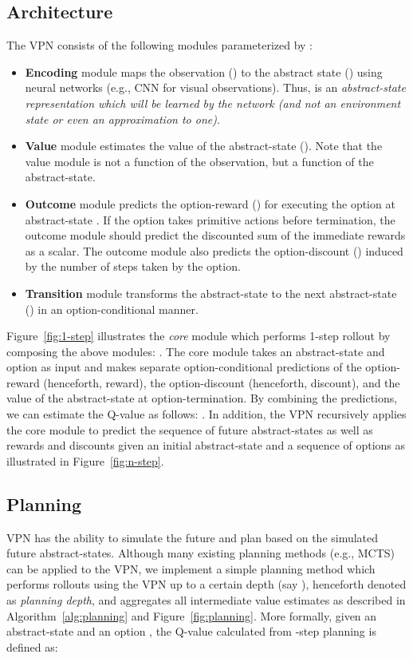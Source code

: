 \documentclass{article}
\newcommand{\cutsubsectionup}{\vspace*{-0.04in}}
\newcommand{\cutsubsectiondown}{\vspace*{-0.03in}}
\begin{document}
\subsection{Architecture} \label{sec:arch}
\cutsubsectiondown
The VPN consists of the following modules parameterized by :

\begin{itemize}[leftmargin=*]
\item \textbf{Encoding} module maps the observation () to the abstract state () using neural networks (e.g., CNN for visual observations). Thus,  is an \textit{abstract-state representation which will be learned by the network (and not an environment state or even an approximation to one)}.
\item \textbf{Value} module estimates the value of the abstract-state (). Note that the value module is not a function of the observation, but a function of the abstract-state.
\item \textbf{Outcome} module predicts the option-reward () for executing the option  at abstract-state . If the option takes  primitive actions before termination, the outcome module should predict the discounted sum of the  immediate rewards as a scalar. The outcome module also predicts the option-discount () induced by the number of steps taken by the option. 
\item \textbf{Transition} module transforms the abstract-state to the next abstract-state () in an option-conditional manner. 
\end{itemize}

Figure~\ref{fig:1-step} illustrates the \textit{core} module which performs 1-step rollout by composing the above modules: . The core module takes an abstract-state and option as input and makes separate option-conditional predictions of the option-reward (henceforth, reward), the option-discount (henceforth, discount), and the value of the  abstract-state at option-termination. By combining the predictions, we can estimate the Q-value  as follows: . In addition, the VPN recursively applies the core module to predict the sequence of future abstract-states as well as rewards and discounts 
given an initial abstract-state and a sequence of options as illustrated in Figure~\ref{fig:n-step}.

\cutsubsectionup
\subsection{Planning} \label{sec:planning}
\cutsubsectiondown
VPN has the ability to simulate the future and plan based on the simulated future abstract-states. Although many existing planning methods (e.g., MCTS) can be applied to the VPN, we implement a simple planning method which performs rollouts using the VPN up to a certain depth (say ), henceforth denoted as \textit{planning depth}, and aggregates all intermediate value estimates as described in Algorithm~\ref{alg:planning} and Figure~\ref{fig:planning}. 
More formally, given an abstract-state  and an option , the Q-value calculated from -step planning is defined as:
\end{document}
